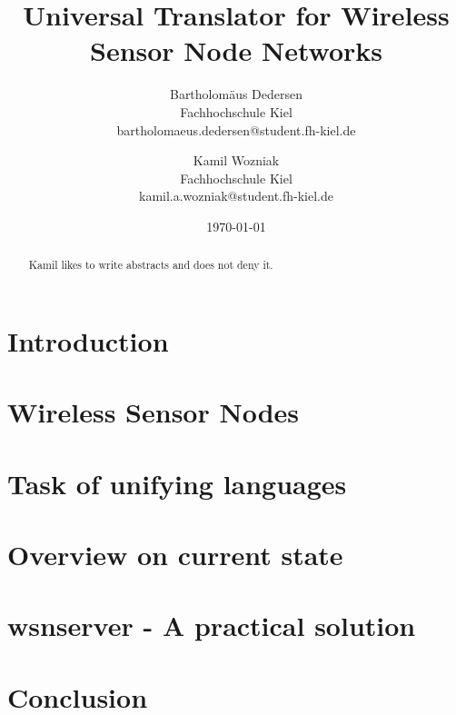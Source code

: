 \documentclass[bibtotocnumbered, headsepline,normalheadings]{report}
\begin{document}
\author{ 
Bartholomäus Dedersen \\ Fachhochschule Kiel \\ bartholomaeus.dedersen@student.fh-kiel.de \and
Kamil Wozniak  \\ Fachhochschule Kiel \\ kamil.a.wozniak@student.fh-kiel.de }

\date{\today} 
\title{Universal Translator for Wireless Sensor Node Networks} 

\maketitle


\begin{abstract}
Kamil likes to write abstracts and does not deny it.
\end{abstract}

\tableofcontents \newpage

\chapter{Introduction}



\chapter{Wireless Sensor Nodes}



\chapter{Task of unifying languages}
\label{chap:unify}



\chapter{Overview on current state}



\chapter{wsnserver - A practical solution}



\chapter{Conclusion}
\end{document}
